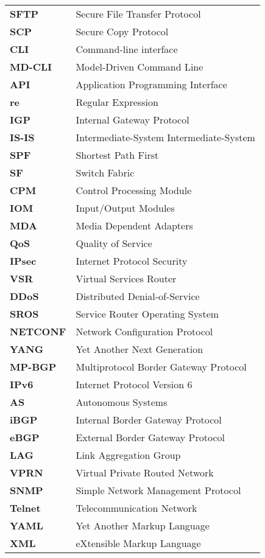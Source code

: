 \begin{tabular}{l l}



\textbf{SFTP} & Secure File Transfer Protocol \\
\textbf{SCP} & Secure Copy Protocol \\
\textbf{CLI} & Command-line interface \\
\textbf{MD-CLI} & Model-Driven Command Line \\
\textbf{API} & Application Programming Interface \\
\textbf{re} & Regular Expression \\
\textbf{IGP} & Internal Gateway Protocol \\
\textbf{IS-IS} & Intermediate-System Intermediate-System \\
\textbf{SPF} & Shortest Path First \\
\textbf{SF} & Switch Fabric \\
\textbf{CPM} & Control Processing Module \\
\textbf{IOM} & Input/Output Modules \\
\textbf{MDA} & Media Dependent Adapters \\
\textbf{QoS} & Quality of Service \\
\textbf{IPsec} & Internet Protocol Security \\
\textbf{VSR} & Virtual Services Router \\
\textbf{DDoS} & Distributed Denial-of-Service \\
\textbf{SROS} & Service Router Operating System \\
\textbf{NETCONF} & Network Configuration Protocol \\
\textbf{YANG} & Yet Another Next Generation \\
\textbf{MP-BGP} & Multiprotocol Border Gateway Protocol \\
\textbf{IPv6} & Internet Protocol Version 6 \\
\textbf{AS} & Autonomous Systems \\
\textbf{iBGP} & Internal Border Gateway Protocol \\
\textbf{eBGP} & External Border Gateway Protocol \\
\textbf{LAG} & Link Aggregation Group \\
\textbf{VPRN} & Virtual Private Routed Network \\
\textbf{SNMP} & Simple Network Management Protocol \\
\textbf{Telnet} & Telecommunication Network \\
\textbf{YAML} & Yet Another Markup Language \\
\textbf{XML} & eXtensible Markup Language \\


\end{tabular}
